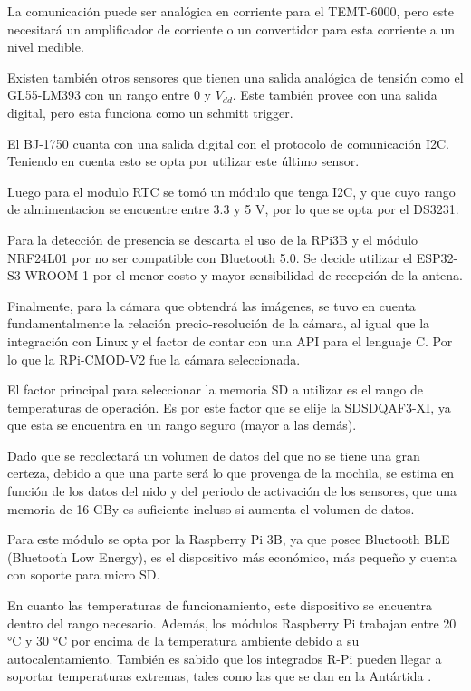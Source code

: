 La comunicación puede ser analógica en corriente para el TEMT-6000, pero este necesitará un amplificador de corriente o un convertidor para esta corriente a un nivel medible.

Existen también otros sensores que tienen una salida analógica de tensión como el GL55-LM393 con un rango entre 0 y $V_{dd}$. Este también provee con una salida digital, pero esta funciona como un schmitt trigger.

El BJ-1750 cuanta con una salida digital con el protocolo de comunicación I2C. Teniendo en cuenta esto se opta por utilizar este último sensor. 

Luego para el modulo RTC se tom\'o un  m\'odulo que tenga I2C, y que cuyo rango de almimentacion se encuentre entre 3.3 y 5 V, por lo que se opta por el DS3231.

Para la detección de presencia se descarta el uso de la RPi3B y el módulo NRF24L01 por no ser compatible con Bluetooth 5.0. Se decide utilizar el ESP32-S3-WROOM-1 por el menor costo y mayor sensibilidad de recepción de la antena.

Finalmente, para la cámara que obtendrá las imágenes, se tuvo en cuenta fundamentalmente la relación precio-resolución de la cámara, al igual que la integración con Linux y el factor de contar con una API para el lenguaje C. Por lo que la RPi-CMOD-V2 fue la cámara seleccionada.






El factor principal para seleccionar la memoria SD a utilizar es el rango de temperaturas de operación. Es por este factor que se elije la SDSDQAF3-XI, ya que esta se encuentra en un rango seguro (mayor a las demás).

Dado que se recolectará un volumen de datos del que no se tiene una gran certeza, debido a que una parte será lo que provenga de la mochila, se estima en función de los datos del nido y del periodo de activación de los sensores, que una memoria de 16 GBy es suficiente incluso si aumenta el volumen de datos.


Para este módulo se opta por la Raspberry Pi 3B, ya que posee Bluetooth BLE (Bluetooth Low Energy), es el dispositivo más económico, más pequeño y cuenta con soporte para micro SD.

En cuanto las temperaturas de funcionamiento, este dispositivo se encuentra dentro del rango necesario. Además, los módulos Raspberry Pi trabajan entre 20 °C y 30 °C por encima de la temperatura ambiente debido a su autocalentamiento. También es sabido que los integrados R-Pi pueden llegar a soportar temperaturas extremas, tales como las que se dan en la Antártida \cite{ref:Penguin}.

